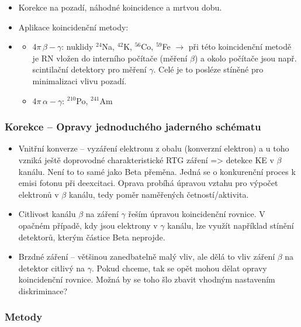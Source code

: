 \begin{itemize}
    \item Korekce na pozadí, náhodné koincidence a mrtvou dobu.
    \item Aplikace koincidenční metody: 
    \item 
    \begin{itemize}
        \item 4$\pi \, \beta - \gamma$: nuklidy $^{24}$Na, $^{42}$K, $^{56}$Co, $^{59}$Fe $\rightarrow$ při této koincidenční metodě je RN vložen do interního počítače (měření $\beta$) a okolo počítače jsou např. scintilační detektory pro měření $\gamma$. Celé je to posléze stíněné pro minimalizaci vlivu pozadí.
        \item 4$\pi \, \alpha - \gamma$: $^{210}$Po, $^{241}$Am
    \end{itemize}
\end{itemize}

\subsubsection{Korekce -- Opravy jednoduchého jaderného schématu}

\begin{itemize}
    \item Vnitřní konverze -- vyzáření elektronu z obalu (konverzní elektron) a u toho vzniká ještě doprovodné charakteristické RTG záření => detekce KE v $\beta $ kanálu. Není to to samé jako Beta přeměna. Jedná se o konkurenční proces k emisi fotonu při deexcitaci. Oprava probíhá úpravou vztahu pro výpočet elektronů v $\beta$ kanálu, tedy poměr naměřených četností/aktivita. 
    \item Citlivost kanálu $\beta$ na záření $\gamma$ řeším úpravou koincidenční rovnice. V opačném případě, kdy jsou elektrony v $\gamma$ kanálu, lze využít například stínění detektorů, kterým částice Beta neprojde.
    \item Brzdné záření -- většinou zanedbatelně malý vliv, ale dělá to vliv záření $\beta$ na detektor citlivý na $\gamma$. Pokud chceme, tak se opět mohou dělat opravy koincidenční rovnice. Možná by se toho šlo zbavit vhodným nastavením diskriminace?
\end{itemize}

\subsubsection{Metody}

